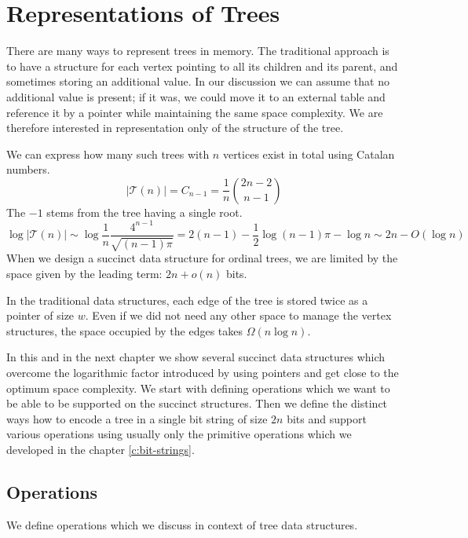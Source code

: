 \chapter{Representations of Trees}

There are many ways to represent trees in memory.
The traditional approach is to have a structure for each vertex pointing to all its children and its parent, and sometimes storing an additional value.
In our discussion we can assume that no additional value is present; if it was, we could move it to an external table and reference it by a pointer while maintaining the same space complexity.
We are therefore interested in representation only of the structure of the tree.

We can express how many such trees with $n$ vertices exist in total using Catalan numbers.
$$ | \mathcal{T}(n) | = C_{n-1} = \frac{1}{n} {2n - 2 \choose n - 1} $$
The $-1$ stems from the tree having a single root.
$$ \log | \mathcal{T}(n) | \sim \log \frac{1}{n}\frac{4^{n-1}}{\sqrt{(n-1)\pi}} = 2(n-1) - \frac{1}{2} \log{(n - 1)\pi} - \log n \sim 2n - O(\log n) $$
When we design a succinct data structure for ordinal trees, we are limited by the space given by the leading term: $2n + o(n)$ bits.

In the traditional data structures, each edge of the tree is stored twice as a pointer of size $w$.
Even if we did not need any other space to manage the vertex structures, the space occupied by the edges takes $\Omega (n \log n)$.

In this and in the next chapter we show several succinct data structures which overcome the logarithmic factor introduced by using pointers and get close to the optimum space complexity.
We start with defining operations which we want to be able to be supported on the succinct structures.
Then we define the distinct ways how to encode a tree in a single bit string of size $2n$ bits and support various operations using usually only the primitive operations which we developed in the chapter \ref{c:bit-strings}.

\section{Operations}

We define operations which we discuss in context of tree data structures.


